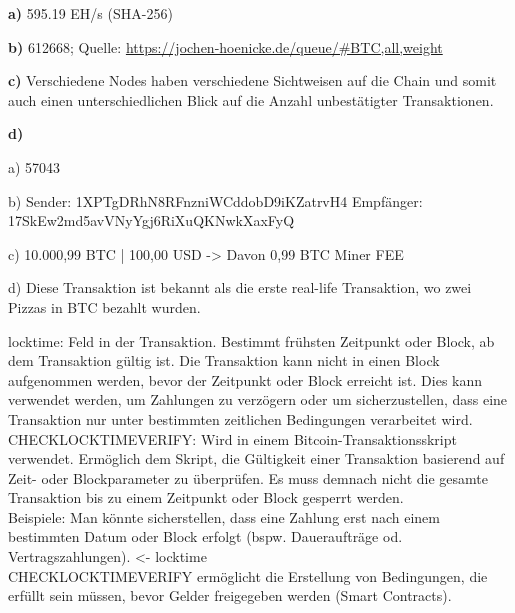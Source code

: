 \documentclass[german]{../uebung}
\begin{document}
\begin{exercise}{5}

    \textbf{a)}
    595.19 EH/s (SHA-256)

    \textbf{b)}
    612668; Quelle: \url{https://jochen-hoenicke.de/queue/#BTC,all,weight}

    \textbf{c)}
    Verschiedene Nodes haben verschiedene Sichtweisen auf die Chain und somit auch einen unterschiedlichen Blick auf die Anzahl unbestätigter Transaktionen.

    \textbf{d)}

    a) 57043

    b) Sender: 1XPTgDRhN8RFnzniWCddobD9iKZatrvH4 Empfänger: 17SkEw2md5avVNyYgj6RiXuQKNwkXaxFyQ

    c) 10.000,99 BTC | 100,00 USD -> Davon 0,99 BTC Miner FEE

    d) Diese Transaktion ist bekannt als die erste real-life Transaktion, wo zwei Pizzas in BTC bezahlt wurden.
\end{exercise}

\begin{exercise}{6}
    locktime: Feld in der Transaktion. Bestimmt frühsten Zeitpunkt oder Block, ab dem Transaktion gültig ist. Die Transaktion kann nicht in einen Block aufgenommen werden, bevor der Zeitpunkt oder Block erreicht ist. Dies kann verwendet werden, um Zahlungen zu verzögern oder um sicherzustellen, dass eine Transaktion nur unter bestimmten zeitlichen Bedingungen verarbeitet wird.\\
    CHECKLOCKTIMEVERIFY: Wird in einem Bitcoin-Transaktionsskript verwendet. Ermöglich dem Skript, die Gültigkeit einer Transaktion basierend auf Zeit- oder Blockparameter zu überprüfen. Es muss demnach nicht die gesamte Transaktion bis zu einem Zeitpunkt oder Block gesperrt werden.\\
    Beispiele: Man könnte sicherstellen, dass eine Zahlung erst nach einem bestimmten Datum oder Block erfolgt (bspw. Daueraufträge od. Vertragszahlungen). <- locktime\\
    CHECKLOCKTIMEVERIFY ermöglicht die Erstellung von Bedingungen, die erfüllt sein müssen, bevor Gelder freigegeben werden (Smart Contracts).
\end{exercise}
\end{document}
